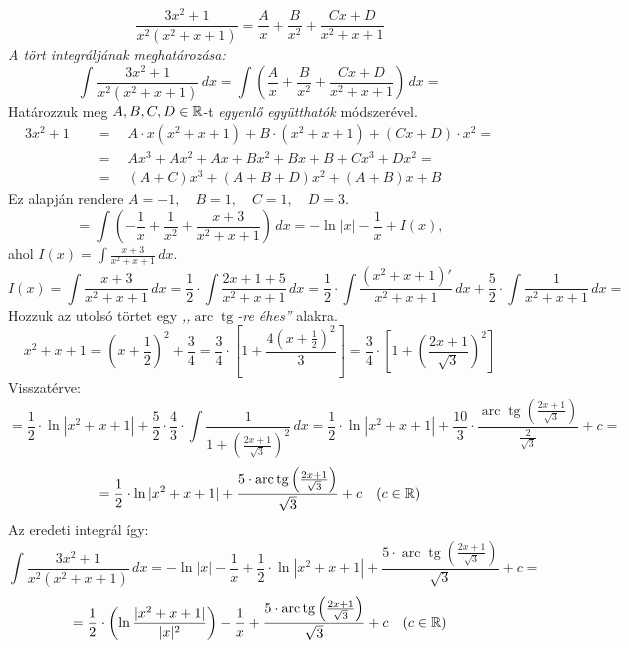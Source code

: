 \documentclass[a4paper,11.5pt]{article}
\DeclareMathOperator{\tg}{tg}
\DeclareMathOperator{\arc}{arc}
\begin{document}
	\begin{exercise}
		\[ \frac{3x^2+1}{x^2(x^2+x+1)}=\frac{A}{x}+\frac{B}{x^2}+\frac{Cx+D}{x^2+x+1} \]
		\textit{A tört integráljának meghatározása:}
		\[ \int\frac{3x^2+1}{x^2(x^2+x+1)}\,dx=\int \left(\frac{A}{x}+\frac{B}{x^2}+\frac{Cx+D}{x^2+x+1}\right)\,dx= \]
		Határozzuk meg $A,B,C,D\in\mathbb{R}$-t \textit{egyenlő együtthatók} módszerével.
		\begin{align*}
			3x^2+1 \quad &=\quad  A\cdot x(x^2+x+1)+B\cdot(x^2+x+1)+(Cx+D)\cdot x^2=\\
						 &=\quad  Ax^3+Ax^2+Ax+Bx^2+Bx+B+Cx^3+Dx^2=\\
						 &=\quad  (A+C)x^3+(A+B+D)x^2+(A+B)x+B
		\end{align*}
		Ez alapján rendere $A = -1, \quad B = 1, \quad C = 1, \quad D = 3$.
		\[ =\int \left(-\frac{1}{x}+\frac{1}{x^2}+\frac{x+3}{x^2+x+1}\right)\,dx=-\ln|x|-\frac{1}{x}+I(x), \]
		ahol $I(x)=\int\frac{x+3}{x^2+x+1}\,dx$.
		\[ I(x)=\int\frac{x+3}{x^2+x+1}\,dx=\frac{1}{2}\cdot\int\frac{2x+1+5}{x^2+x+1}\,dx=\frac{1}{2}\cdot\int\frac{(x^2+x+1)'}{x^2+x+1}\,dx+\frac{5}{2}\cdot\int\frac{1}{x^2+x+1}\,dx= \]
		Hozzuk az utolsó törtet egy \textit{,,$\arc\tg$-re éhes''} alakra.
		\[ x^2+x+1=\left(x+\frac{1}{2}\right)^2+\frac{3}{4}=\frac{3}{4}\cdot\left[1+\frac{4\left(x+\frac{1}{2}\right)^2}{3}\right]=\frac{3}{4}\cdot\left[1+\left(\frac{2x+1}{\sqrt{3}}\right)^2\right] \]
		Visszatérve:
		\[=\frac{1}{2}\cdot\ln|x^2+x+1|+\frac{5}{2}\cdot\frac{4}{3}\cdot\int\frac{1}{1+\left(\frac{2x+1}{\sqrt{3}}\right)^2}\,dx=\frac{1}{2}\cdot\ln|x^2+x+1|+\frac{10}{3}\cdot\frac{\arc\tg\left(\frac{2x+1}{\sqrt{3}}\right)}{\frac{2}{\sqrt{3}}}+c=\]
		\[=\frac{1}{2}\cdot\ln|x^2+x+1|+\frac{5\cdot\arc\tg\left(\frac{2x+1}{\sqrt{3}}\right)}{\sqrt{3}}+c\quad (c\in\R) \]
		Az eredeti integrál így:
		\[ \int\frac{3x^2+1}{x^2(x^2+x+1)}\,dx=-\ln|x|-\frac{1}{x}+\frac{1}{2}\cdot\ln|x^2+x+1|+\frac{5\cdot\arc\tg\left(\frac{2x+1}{\sqrt{3}}\right)}{\sqrt{3}}+c=\]
		\[= \frac{1}{2}\cdot\left(\ln\frac{|x^2+x+1|}{|x|^2}\right)-\frac{1}{x}+\frac{5\cdot\arc\tg\left(\frac{2x+1}{\sqrt{3}}\right)}{\sqrt{3}}+c \quad (c\in\R) \]
	\end{exercise}
\end{document}
